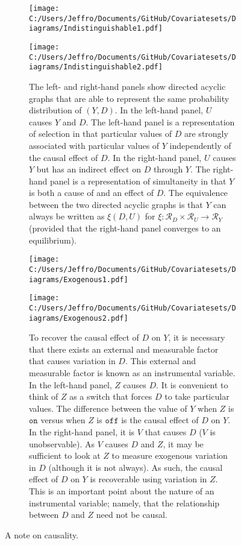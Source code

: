 \documentclass[10pt,a4paper,twoside]{article}
\numberwithin{equation}{section}
\begin{document}
\begin{figure}[p]
\centering
\begin{subfigure}{0.4\textwidth}
  \centering
  \texttt{[image: C:/Users/Jeffro/Documents/GitHub/Covariatesets/Diagrams/Indistinguishable1.pdf]}
  \label{fig:indistinguishable1}
  \end{subfigure}
  \begin{subfigure}{0.4\textwidth}
  \centering
  \texttt{[image: C:/Users/Jeffro/Documents/GitHub/Covariatesets/Diagrams/Indistinguishable2.pdf]}
  \label{fig:indistinguishable2}
  \end{subfigure}
\begin{subfigure}{0.8\textwidth}
  \caption{The left- and right-hand panels show directed acyclic graphs that are able to represent the same probability distribution of $(Y,D)$. In the left-hand panel, $U$ causes $Y$ and $D$. The left-hand panel is a representation of selection in that particular values of $D$ are strongly associated with particular values of $Y$ independently of the causal effect of $D$. In the right-hand panel, $U$ causes $Y$ but has an indirect effect on $D$ through $Y$. The right-hand panel is a representation of simultaneity in that $Y$ is both a cause of and an effect of $D$. The equivalence between the two directed acyclic graphs is that $Y$ can always be written as $\xi(D,U)$ for $\xi : \mathcal{R}_D\times\mathcal{R}_U\rightarrow\mathcal{R}_Y$ (provided that the right-hand panel converges to an equilibrium).}
  \end{subfigure}
   \begin{subfigure}{0.4\textwidth}
  \centering
  \texttt{[image: C:/Users/Jeffro/Documents/GitHub/Covariatesets/Diagrams/Exogenous1.pdf]}
  \label{fig:exogenous1}
  \end{subfigure}
   \begin{subfigure}{0.4\textwidth}
  \centering
  \texttt{[image: C:/Users/Jeffro/Documents/GitHub/Covariatesets/Diagrams/Exogenous2.pdf]}
  \label{fig:exogenous2}
  \end{subfigure}
  \begin{subfigure}{0.8\textwidth}
  \caption{To recover the causal effect of $D$ on $Y$, it is necessary that there exists an external and measurable factor that causes variation in $D$. This external and measurable factor is known as an instrumental variable. In the left-hand panel, $Z$ causes $D$. It is convenient to think of $Z$ as a switch that forces $D$ to take particular values. The difference between the value of $Y$ when $Z$ is $\mathtt{on}$ versus when $Z$ is $\mathtt{off}$ is the causal effect of $D$ on $Y$. In the right-hand panel, it is $V$ that causes $D$ ($V$ is unobservable). As $V$ causes $D$ and $Z$, it may be sufficient to look at $Z$ to measure exogenous variation in $D$ (although it is not always). As such, the causal effect of $D$ on $Y$ is recoverable using variation in $Z$. This is an important point about the nature of an instrumental variable; namely, that the relationship between $D$ and $Z$ need not be causal.}
  \end{subfigure}
  \caption{A note on causality.}
  \label{fig:causality}
\end{figure}
\end{document}
